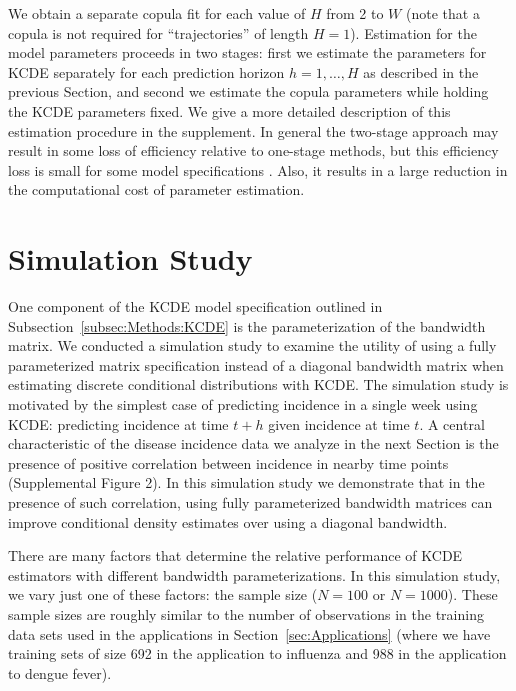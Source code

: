 \documentclass[times, doublespace]{simauth}\usepackage[]{graphicx}\usepackage[]{color}
\begin{document}
We obtain a separate copula fit for each value of $H$ from 2 to $W$ (note that a
copula is not required for ``trajectories'' of length $H = 1$).
Estimation for the model parameters proceeds in two stages:
first we estimate the parameters for KCDE separately for each prediction
horizon $h = 1, \ldots, H$ as described in the previous Section, and second
we estimate the copula parameters while holding the KCDE parameters fixed.
We give a more detailed description of this estimation
procedure in the supplement.  In general the two-stage approach may result in
some loss of efficiency relative to one-stage methods, but this efficiency
loss is small for some model specifications
\cite{joe2005asymptoticEfficiencyTwoStageCopula}.
Also, it results in a large reduction in the computational cost of parameter
estimation.

\section{Simulation Study}
\label{sec:SimStudy}

One component of the KCDE model specification outlined in
Subsection~\ref{subsec:Methods:KCDE} is the parameterization of the bandwidth matrix.
We conducted a simulation study to examine the utility of using a
fully parameterized matrix specification instead of a diagonal bandwidth matrix when
estimating discrete conditional distributions with KCDE.  The simulation study
is motivated by the simplest case of predicting
incidence in a single week using KCDE: predicting incidence at time $t + h$ given
incidence at time $t$.  A central characteristic of the disease
incidence data we analyze in the next Section is the presence of positive
correlation between incidence in nearby time points
(Supplemental Figure 2).  In this simulation study we demonstrate that
in the presence of such correlation, using fully parameterized bandwidth
matrices can improve conditional density estimates over using a diagonal
bandwidth.

There are many factors that determine the relative performance of KCDE
estimators with different bandwidth parameterizations.  In this simulation
study, we vary just one of these factors:
the sample size ($N = 100$ or $N = 1000$).  These sample sizes are roughly similar to
the number of observations in the training data sets used in the applications in
Section~\ref{sec:Applications} (where we have training sets of size 692 in the
application to influenza and 988 in the application to dengue fever).
\end{document}
